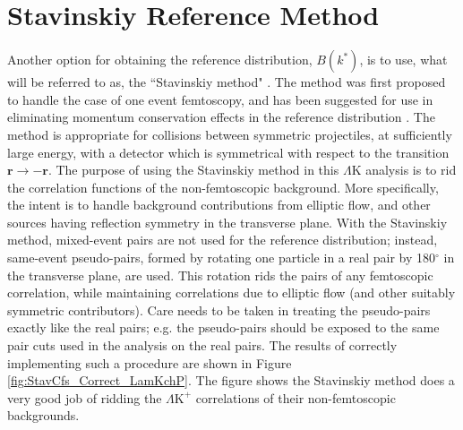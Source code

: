 \documentclass[ALICE,manyauthors]{cernphprep}
\newcommand{\LamK}{$\Lambda$K\xspace}
\newcommand{\LamKchP}{$\Lambda\mathrm{K^{+}}$\xspace}
\newcommand{\LamKchPALamKchM}{$\Lambda\mathrm{K^{+}}$ ($\overline{\Lambda}\mathrm{K^{-}}$)\xspace}
\begin{document}
\section{Stavinskiy Reference Method}
\label{App:StavMethod}

Another option for obtaining the reference distribution, $B(k^{*})$, is to use, what will be referred to as, the ``Stavinskiy method" \cite{Stavinskiy04}.
The method was first proposed to handle the case of one event femtoscopy, and has been suggested for use in eliminating momentum conservation effects in the reference distribution \cite{Lisa:2005dd}.
The method is appropriate for collisions between symmetric projectiles, at sufficiently large energy, with a detector which is symmetrical with respect to the transition $\mathbf{r} \rightarrow \mathbf{-r}$.
The purpose of using the Stavinskiy method in this \LamK analysis is to rid the correlation functions of the non-femtoscopic background.  
More specifically, the intent is to handle background contributions from elliptic flow, and other sources having reflection symmetry in the transverse plane.  
With the Stavinskiy method, mixed-event pairs are not used for the reference distribution; instead, same-event pseudo-pairs, formed by rotating one particle in a real pair by 180$^\circ$ in the transverse plane, are used.  
This rotation rids the pairs of any femtoscopic correlation, while maintaining correlations due to elliptic flow (and other suitably symmetric contributors).
Care needs to be taken in treating the pseudo-pairs exactly like the real pairs; e.g. the pseudo-pairs should be exposed to the same pair cuts used in the analysis on the real pairs.
The results of correctly implementing such a procedure are shown in Figure \ref{fig:StavCfs_Correct_LamKchP}.  
The figure shows the Stavinskiy method does a very good job of ridding the \LamKchP correlations of their non-femtoscopic backgrounds.  

\begin{comment}
\begin{figure}[h!]
  \centering
  \texttt{[image: /home/jesse/Analysis/FemtoAnalysis/AnalysisNotes/4\_CorrelationFunctions/Figures/OnlyTwo/canKStarCfsLamKchPwConj\_20180505vs20180505StavCf\_CustomRebin.pdf]}
  \caption[\LamKchP Stavinskiy Correlation Functions]
  {
  \LamKchPALamKchM correlation functions built using the Stavinskiy method for 0--10\%, 10--30\%, and 30--50\% centralities.  
  Closed (red) symbols represent correlations built using the normal mixed-event reference distribution, while open (green) symbols represent correlations formed using the Stavinskiy same-event pseudo-pairs as a reference.
  }
  \label{fig:StavCfs_Correct_LamKchP}
\end{figure}
\end{comment}
\end{document}
